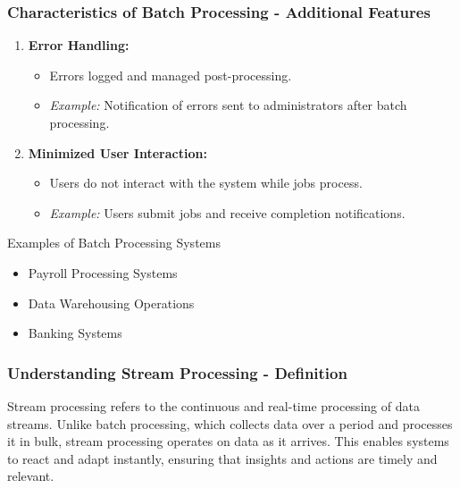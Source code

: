 \documentclass{beamer}
\begin{document}
\begin{frame}[fragile]
    \frametitle{Characteristics of Batch Processing - Additional Features}
    \begin{enumerate}[resume]
        \item \textbf{Error Handling:}
            \begin{itemize}
                \item Errors logged and managed post-processing.
                \item \textit{Example:} Notification of errors sent to administrators after batch processing.
            \end{itemize}

        \item \textbf{Minimized User Interaction:}
            \begin{itemize}
                \item Users do not interact with the system while jobs process.
                \item \textit{Example:} Users submit jobs and receive completion notifications.
            \end{itemize}
    \end{enumerate}

    \begin{block}{Examples of Batch Processing Systems}
        \begin{itemize}
            \item Payroll Processing Systems
            \item Data Warehousing Operations
            \item Banking Systems
        \end{itemize}
    \end{block}
\end{frame}

\begin{frame}[fragile]
    \frametitle{Understanding Stream Processing - Definition}
    Stream processing refers to the continuous and real-time processing of data streams. Unlike batch processing, which collects data over a period and processes it in bulk, stream processing operates on data as it arrives. This enables systems to react and adapt instantly, ensuring that insights and actions are timely and relevant.
\end{frame}
\end{document}
